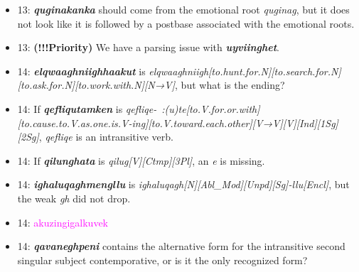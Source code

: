 \documentclass{article}
\begin{document}
\begin{itemize}
\item 13: \textit{\textbf{quginakanka}} should come from the emotional root \textit{quginag}, but it does not look like it is followed by a postbase associated with the emotional roots.

\item 13: \textbf{(!!!Priority)} We have a parsing issue with \textit{\textbf{uyviinghet}}.

\item 14: \textit{\textbf{elqwaaghniighhaakut}} is \textit{elqwaaghniigh[to.hunt.for.N][to.search.for.N][to.ask.for.N][to.work.with.N][N→V]}, but what is the ending?

\item 14: If \textit{\textbf{qefliqutamken}} is \textit{qefliqe-~:(u)te[to.V.for.or.with][to.cause.to.V.as.one.is.V-ing][to.V.toward.each.other][V→V][V][Ind][1Sg][2Sg]}, \textit{qefliqe} is an intransitive verb.

\item 14: If \textit{\textbf{qilunghata}} is \textit{qilug[V][Ctmp][3Pl]}, an \textit{e} is missing.

\item 14: \textit{\textbf{ighaluqaghmengllu}} is \textit{ighaluqagh[N][Abl\_Mod][Unpd][Sg]-llu[Encl]}, but the weak \textit{gh} did not drop.

\item 14: \textcolor{magenta}{akuzingigalkuvek}

\item 14: \textit{\textbf{qavaneghpeni}} contains the alternative form for the intransitive second singular subject contemporative, or is it the only recognized form?
\end{itemize}
\end{document}
